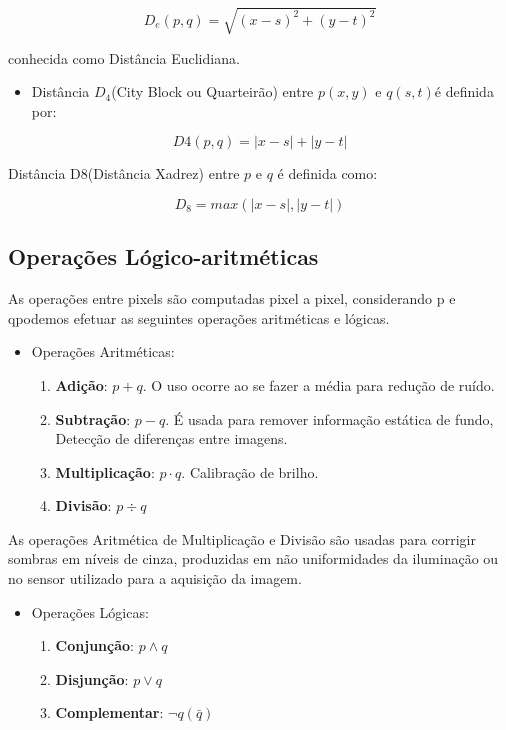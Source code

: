 \documentclass[
  brazilian,
]{book}
\providecommand{\tightlist}{%
  \setlength{\itemsep}{0pt}\setlength{\parskip}{0pt}}
\begin{document}
\[D_e(p,q) = \sqrt{(x-s)^2 + (y-t)^2}\]

conhecida como Distância Euclidiana.

\begin{itemize}
\tightlist
\item
  Distância \(D_4\)(City Block ou Quarteirão) entre \(p(x,y)\) e \(q(s,t)\)é definida por:
\end{itemize}

\[D4(p,q)=|x-s|+|y-t|\]

Distância D8(Distância Xadrez) entre \(p\) e \(q\) é definida como:

\[D_8 = max(|x-s|,|y-t|)\]

\hypertarget{operauxe7uxf5es-luxf3gico-aritmuxe9ticas}{%
\subsection{Operações Lógico-aritméticas}\label{operauxe7uxf5es-luxf3gico-aritmuxe9ticas}}

As operações entre pixels são computadas pixel a pixel, considerando p e qpodemos efetuar as seguintes operações aritméticas e lógicas.

\begin{itemize}
\tightlist
\item
  Operações Aritméticas:

  \begin{enumerate}
  \def\labelenumi{\arabic{enumi}.}
  \tightlist
  \item
    \textbf{Adição}: \(p+q\). O uso ocorre ao se fazer a média para redução de ruído.
  \item
    \textbf{Subtração}: \(p-q\). É usada para remover informação estática de fundo, Detecção de diferenças entre imagens.
  \item
    \textbf{Multiplicação}: \(p\cdot q\). Calibração de brilho.
  \item
    \textbf{Divisão}: \(p\div q\)
  \end{enumerate}
\end{itemize}

As operações Aritmética de Multiplicação e Divisão são usadas para corrigir sombras em níveis de cinza, produzidas em não uniformidades da iluminação ou no sensor utilizado para a aquisição da imagem.

\begin{itemize}
\tightlist
\item
  Operações Lógicas:

  \begin{enumerate}
  \def\labelenumi{\arabic{enumi}.}
  \tightlist
  \item
    \textbf{Conjunção}: \(p\wedge q\)
  \item
    \textbf{Disjunção}: \(p\vee q\)
  \item
    \textbf{Complementar}: \(\neg q(\bar{q})\)
  \end{enumerate}
\end{itemize}
\end{document}
